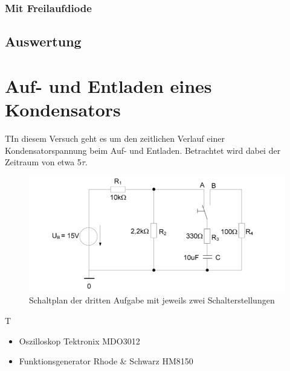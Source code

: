 \documentclass{article}
\begin{document}
\subsubsection{Mit Freilaufdiode}

\subsection{Auswertung}

\newpage

\section{Auf- und Entladen eines Kondensators}
\begin{task}
TIn diesem Versuch geht es um den zeitlichen Verlauf einer Kondensatorspannung beim Auf- und Entladen. Betrachtet wird dabei der Zeitraum von etwa 5$\tau$.
\end{task}
\begin{figure}[h]
    \begin{center}
        \includegraphics{../assets/images/ET2P4/Schaltplan3.PNG}
        \caption{Schaltplan der dritten Aufgabe mit jeweils zwei Schalterstellungen}
    \end{center}
\end{figure}

\begin{devlist}
    T
    \begin{itemize}
        \item Oszilloskop Tektronix MDO3012
        \item Funktionsgenerator Rhode \& Schwarz HM8150
    \end{itemize}
\end{devlist}
\end{document}
